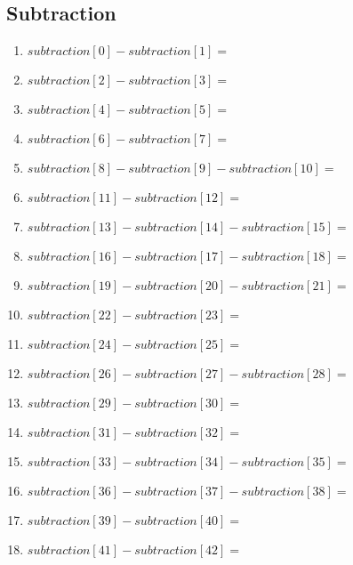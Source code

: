 \documentclass[11pt]{article}
\begin{document}
\subsection{Subtraction}
\begin{enumerate}
	\item ${{ subtraction[0] }} - {{ subtraction[1] }} =$
	\item ${{ subtraction[2] }} - {{ subtraction[3] }} =$
	\item ${{ subtraction[4] }} - {{ subtraction[5] }} =$
	\item ${{ subtraction[6] }} - {{ subtraction[7] }} =$
	\item ${{ subtraction[8] }} - {{ subtraction[9] }} - {{ subtraction[10] }} =$
	\item ${{ subtraction[11] }} - {{ subtraction[12] }} =$
	\item ${{ subtraction[13] }} - {{ subtraction[14] }} - {{ subtraction[15] }} =$
	\item ${{ subtraction[16] }} - {{ subtraction[17] }} - {{ subtraction[18] }} =$
	\item ${{ subtraction[19] }} - {{ subtraction[20] }} - {{ subtraction[21] }} =$
	\item ${{ subtraction[22] }} - {{ subtraction[23] }} =$
	\item ${{ subtraction[24] }} - {{ subtraction[25] }} =$
	\item ${{ subtraction[26] }} - {{ subtraction[27] }} - {{ subtraction[28] }} =$
	\item ${{ subtraction[29] }} - {{ subtraction[30] }} =$
	\item ${{ subtraction[31] }} - {{ subtraction[32] }} =$
	\item ${{ subtraction[33] }} - {{ subtraction[34] }} - {{ subtraction[35] }} =$
	\item ${{ subtraction[36] }} - {{ subtraction[37] }} - {{ subtraction[38] }} =$
	\item ${{ subtraction[39] }} - {{ subtraction[40] }} =$
	\item ${{ subtraction[41] }} - {{ subtraction[42] }} =$
\end{enumerate}
\end{document}
